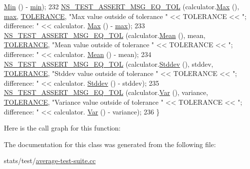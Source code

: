 \begin{DoxyCode}
      \hyperlink{classns3_1_1Average_a4649e7990b939fc55360312ac4ab6828}{Min} () - \hyperlink{80211b_8c_ac6afabdc09a49a433ee19d8a9486056d}{min});
232   \hyperlink{group__testing_ga9e7861b56b4e70db3b56044cb7a28e41}{NS\_TEST\_ASSERT\_MSG\_EQ\_TOL} (calculator.\hyperlink{classns3_1_1Average_a259a45edf08a70e46c79c627944ff9af}{Max} (), \hyperlink{80211b_8c_affe776513b24d84b39af8ab0930fef7f}{max}, 
      \hyperlink{average-test-suite_8cc_a89311a98397f9d6967d2cb10d5152d77}{TOLERANCE}, \textcolor{stringliteral}{"Max value outside of tolerance "} << TOLERANCE << \textcolor{stringliteral}{"; difference: "} << calculator.
      \hyperlink{classns3_1_1Average_a259a45edf08a70e46c79c627944ff9af}{Max} () - \hyperlink{80211b_8c_affe776513b24d84b39af8ab0930fef7f}{max});
233   \hyperlink{group__testing_ga9e7861b56b4e70db3b56044cb7a28e41}{NS\_TEST\_ASSERT\_MSG\_EQ\_TOL} (calculator.\hyperlink{classns3_1_1Average_a750277f678abfdc0184d697238975b93}{Mean} (), mean, 
      \hyperlink{average-test-suite_8cc_a89311a98397f9d6967d2cb10d5152d77}{TOLERANCE}, \textcolor{stringliteral}{"Mean value outside of tolerance "} << TOLERANCE << \textcolor{stringliteral}{"; difference: "} << calculator.
      \hyperlink{classns3_1_1Average_a750277f678abfdc0184d697238975b93}{Mean} () - mean);
234   \hyperlink{group__testing_ga9e7861b56b4e70db3b56044cb7a28e41}{NS\_TEST\_ASSERT\_MSG\_EQ\_TOL} (calculator.\hyperlink{classns3_1_1Average_ac7536c397973130662606c1019049503}{Stddev} (), stddev, 
      \hyperlink{average-test-suite_8cc_a89311a98397f9d6967d2cb10d5152d77}{TOLERANCE}, \textcolor{stringliteral}{"Stddev value outside of tolerance "} << TOLERANCE << \textcolor{stringliteral}{"; difference: "} << calculator.
      \hyperlink{classns3_1_1Average_ac7536c397973130662606c1019049503}{Stddev} () - stddev);
235   \hyperlink{group__testing_ga9e7861b56b4e70db3b56044cb7a28e41}{NS\_TEST\_ASSERT\_MSG\_EQ\_TOL} (calculator.\hyperlink{classns3_1_1Average_af81b1dec6bcafabf4ed63f43fdd8f568}{Var} (), variance, 
      \hyperlink{average-test-suite_8cc_a89311a98397f9d6967d2cb10d5152d77}{TOLERANCE}, \textcolor{stringliteral}{"Variance value outside of tolerance "} << TOLERANCE << \textcolor{stringliteral}{"; difference: "} << calculator.
      \hyperlink{classns3_1_1Average_af81b1dec6bcafabf4ed63f43fdd8f568}{Var} () - variance);
236 \}
\end{DoxyCode}


Here is the call graph for this function\+:




The documentation for this class was generated from the following file\+:\begin{DoxyCompactItemize}
\item 
stats/test/\hyperlink{average-test-suite_8cc}{average-\/test-\/suite.\+cc}\end{DoxyCompactItemize}
